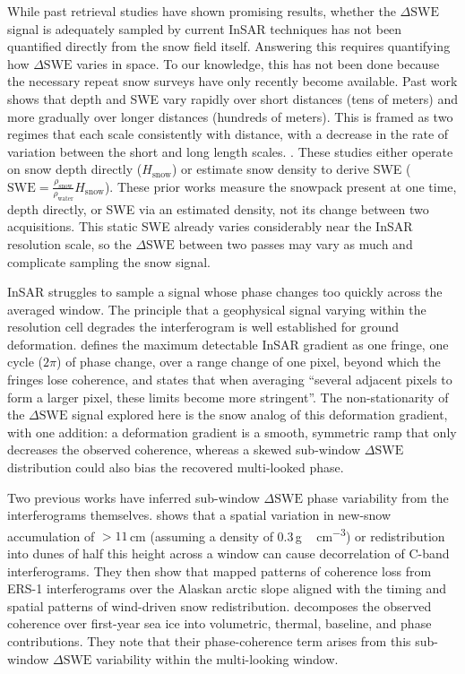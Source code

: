 \documentclass[tc, manuscript]{copernicus}
\begin{document}
While past retrieval studies have shown promising results, whether the $\Delta\mathrm{SWE}$ signal is adequately sampled by current InSAR techniques has not been quantified directly from the snow field itself. Answering this requires quantifying how $\Delta\mathrm{SWE}$ varies in space. To our knowledge, this has not been done because the necessary repeat snow surveys have only recently become available. Past work shows that depth and SWE vary rapidly over short distances (tens of meters) and more gradually over longer distances (hundreds of meters). This is framed as two regimes that each scale consistently with distance, with a decrease in the rate of variation between the short and long length scales. \citep{deems2006, trujillo2007topographic-0ec, Clark2011, mendoza2020, Miller2022}. These studies either operate on snow depth directly ($H_{\mathrm{snow}}$) or estimate snow density to derive SWE ($\mathrm{SWE} = \frac{\rho_{\mathrm{snow}}}{\rho_{\mathrm{water}}} H_{\mathrm{snow}}$). These prior works measure the snowpack present at one time, depth directly, or SWE via an estimated density, not its change between two acquisitions. This static SWE already varies considerably near the InSAR resolution scale, so the $\Delta\mathrm{SWE}$ between two passes may vary as much and complicate sampling the snow signal.

InSAR struggles to sample a signal whose phase changes too quickly across the averaged window. The principle that a geophysical signal varying within the resolution cell degrades the interferogram is well established for ground deformation. \citet{Massonnet1998} defines the maximum detectable InSAR gradient as one fringe, one cycle ($2\pi$) of phase change, over a range change of one pixel, beyond which the fringes lose coherence, and states that when averaging ``several adjacent pixels to form a larger pixel, these limits become more stringent''. The non-stationarity of the $\Delta\mathrm{SWE}$ signal explored here is the snow analog of this deformation gradient, with one addition: a deformation gradient is a smooth, symmetric ramp that only decreases the observed coherence, whereas a skewed sub-window $\Delta\mathrm{SWE}$ distribution could also bias the recovered multi-looked phase.

Two previous works have inferred sub-window $\Delta\mathrm{SWE}$ phase variability from the interferograms themselves. \citet{LiSturm2002} shows that a spatial variation in new-snow accumulation of $>11$\,\unit{cm} (assuming a density of 0.3\,\unit{g\,cm^{-3}}) or redistribution into dunes of half this height across a window can cause decorrelation of C-band interferograms. They then show that mapped patterns of coherence loss from ERS-1 interferograms over the Alaskan arctic slope aligned with the timing and spatial patterns of wind-driven snow redistribution. \citet{ming2026} decomposes the observed coherence over first-year sea ice into volumetric, thermal, baseline, and phase contributions. They note that their phase-coherence term arises from this sub-window $\Delta\mathrm{SWE}$ variability within the multi-looking window.
\end{document}
